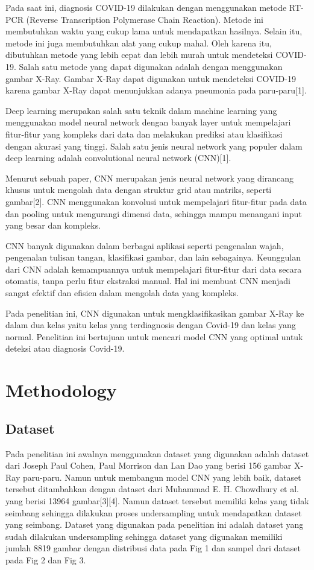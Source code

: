 \documentclass[conference]{IEEEtran}
\begin{document}
Pada saat ini, diagnosis COVID-19 dilakukan dengan menggunakan metode RT-PCR (Reverse Transcription Polymerase Chain Reaction). Metode ini membutuhkan waktu yang cukup lama untuk mendapatkan hasilnya. Selain itu, metode ini juga membutuhkan alat yang cukup mahal. Oleh karena itu, dibutuhkan metode yang lebih cepat dan lebih murah untuk mendeteksi COVID-19. Salah satu metode yang dapat digunakan adalah dengan menggunakan gambar X-Ray. Gambar X-Ray dapat digunakan untuk mendeteksi COVID-19 karena gambar X-Ray dapat menunjukkan adanya pneumonia pada paru-paru[1].

Deep learning merupakan salah satu teknik dalam machine learning yang menggunakan model neural network dengan banyak layer untuk mempelajari fitur-fitur yang kompleks dari data dan melakukan prediksi atau klasifikasi dengan akurasi yang tinggi. Salah satu jenis neural network yang populer dalam deep learning adalah convolutional neural network (CNN)[1].

Menurut sebuah paper, CNN merupakan jenis neural network yang dirancang khusus untuk mengolah data dengan struktur grid atau matriks, seperti gambar[2]. CNN menggunakan konvolusi untuk mempelajari fitur-fitur pada data dan pooling untuk mengurangi dimensi data, sehingga mampu menangani input yang besar dan kompleks.

CNN banyak digunakan dalam berbagai aplikasi seperti pengenalan wajah, pengenalan tulisan tangan, klasifikasi gambar, dan lain sebagainya. Keunggulan dari CNN adalah kemampuannya untuk mempelajari fitur-fitur dari data secara otomatis, tanpa perlu fitur ekstraksi manual. Hal ini membuat CNN menjadi sangat efektif dan efisien dalam mengolah data yang kompleks.

Pada penelitian ini, CNN digunakan untuk mengklasifikasikan gambar X-Ray ke dalam dua kelas yaitu kelas yang terdiagnosis dengan Covid-19 dan kelas yang normal. Penelitian ini bertujuan untuk mencari model CNN yang optimal untuk deteksi atau diagnosis Covid-19.

\section{Methodology}

\subsection{Dataset}
Pada penelitian ini awalnya menggunakan dataset yang digunakan adalah dataset dari Joseph Paul Cohen, Paul Morrison dan Lan Dao yang berisi 156 gambar X-Ray paru-paru. Namun untuk membangun model CNN yang lebih baik, dataset tersebut ditambahkan dengan dataset dari Muhammad E. H. Chowdhury et al. yang berisi 13964 gambar[3][4]. Namun dataset tersebut memiliki kelas yang tidak seimbang sehingga dilakukan proses undersampling untuk mendapatkan dataset yang seimbang. Dataset yang digunakan pada penelitian ini adalah dataset yang sudah dilakukan undersampling sehingga dataset yang digunakan memiliki jumlah 8819 gambar dengan distribusi data pada Fig 1 dan sampel dari dataset pada Fig 2 dan Fig 3.
\end{document}
